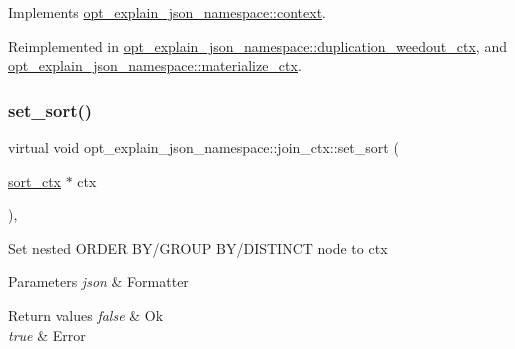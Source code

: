 Implements \mbox{\hyperlink{classopt__explain__json__namespace_1_1context_a07c46bab31a35d88c13ccdca82755aaa}{opt\+\_\+explain\+\_\+json\+\_\+namespace\+::context}}.



Reimplemented in \mbox{\hyperlink{classopt__explain__json__namespace_1_1duplication__weedout__ctx_ac1df854f614e849880a6449f5c92a98b}{opt\+\_\+explain\+\_\+json\+\_\+namespace\+::duplication\+\_\+weedout\+\_\+ctx}}, and \mbox{\hyperlink{classopt__explain__json__namespace_1_1materialize__ctx_ae1e9e31aa9072cf01733c417a1821773}{opt\+\_\+explain\+\_\+json\+\_\+namespace\+::materialize\+\_\+ctx}}.

\mbox{\label{classopt__explain__json__namespace_1_1join__ctx_a4da472e6a104b4e13dbc0a39450b4a95}} 
\subsubsection{\texorpdfstring{set\+\_\+sort()}{set\_sort()}}
{\footnotesize\ttfamily virtual void opt\+\_\+explain\+\_\+json\+\_\+namespace\+::join\+\_\+ctx\+::set\+\_\+sort (\begin{DoxyParamCaption}\item[{\mbox{\hyperlink{classopt__explain__json__namespace_1_1sort__ctx}{sort\+\_\+ctx}} $\ast$}]{ctx }\end{DoxyParamCaption})\hspace{0.3cm}{\ttfamily [inline]}, {\ttfamily [virtual]}}

Set nested O\+R\+D\+ER B\+Y/\+G\+R\+O\+UP B\+Y/\+D\+I\+S\+T\+I\+N\+CT node to {\ttfamily ctx} 


\begin{DoxyParams}{Parameters}
{\em json} & Formatter\\
\hline
\end{DoxyParams}

\begin{DoxyRetVals}{Return values}
{\em false} & Ok \\
\hline
{\em true} & Error \\
\hline
\end{DoxyRetVals}


